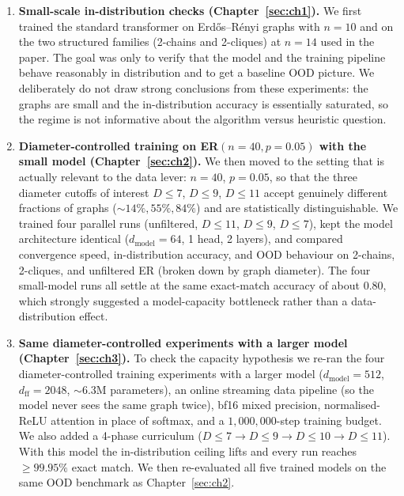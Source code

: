 \documentclass[11pt,a4paper]{article}
\begin{document}
\begin{enumerate}
    \item \textbf{Small-scale in-distribution checks
    (Chapter~\ref{sec:ch1}).} We first trained the standard transformer
    on Erd\H{o}s--R\'enyi graphs with $n = 10$ and on the two structured
    families (2-chains and 2-cliques) at $n = 14$ used in the paper. The goal
    was only to verify that the model and the training pipeline behave
    reasonably in distribution and to get a baseline OOD picture. We
    deliberately do not draw strong conclusions from these experiments: the
    graphs are small and the in-distribution accuracy is essentially
    saturated, so the regime is not informative about the algorithm versus
    heuristic question.

    \item \textbf{Diameter-controlled training on
    ER$(n = 40, p = 0.05)$ with the small model (Chapter~\ref{sec:ch2}).}
    We then moved to the setting that is actually relevant to the data
    lever: $n = 40$, $p = 0.05$, so that the three diameter cutoffs of
    interest $D \le 7$, $D \le 9$, $D \le 11$ accept genuinely different
    fractions of graphs ($\sim 14\%, 55\%, 84\%$) and are statistically
    distinguishable. We trained four parallel runs (unfiltered, $D \le 11$,
    $D \le 9$, $D \le 7$), kept the model architecture identical
    ($d_{\mathrm{model}} = 64$, 1 head, 2 layers), and compared
    convergence speed, in-distribution accuracy, and OOD behaviour on
    2-chains, 2-cliques, and unfiltered ER (broken down by graph diameter).
    The four small-model runs all settle at the same exact-match
    accuracy of about $0.80$, which strongly suggested a model-capacity
    bottleneck rather than a data-distribution effect.

    \item \textbf{Same diameter-controlled experiments with a larger model
    (Chapter~\ref{sec:ch3}).} To check the capacity hypothesis we re-ran the
    four diameter-controlled training experiments with a larger model
    ($d_{\mathrm{model}} = 512$, $d_{\mathrm{ff}} = 2048$, $\sim 6.3$M
    parameters), an online streaming data pipeline (so the model never sees
    the same graph twice), bf16 mixed precision, normalised-ReLU attention
    in place of softmax, and a $1{,}000{,}000$-step training budget. We
    also added a 4-phase curriculum
    ($D \le 7 \to D \le 9 \to D \le 10 \to D \le 11$). With this model the
    in-distribution ceiling lifts and every run reaches
    $\ge 99.95\%$ exact match. We then re-evaluated all five trained models
    on the same OOD benchmark as Chapter~\ref{sec:ch2}.
\end{enumerate}
\end{document}
